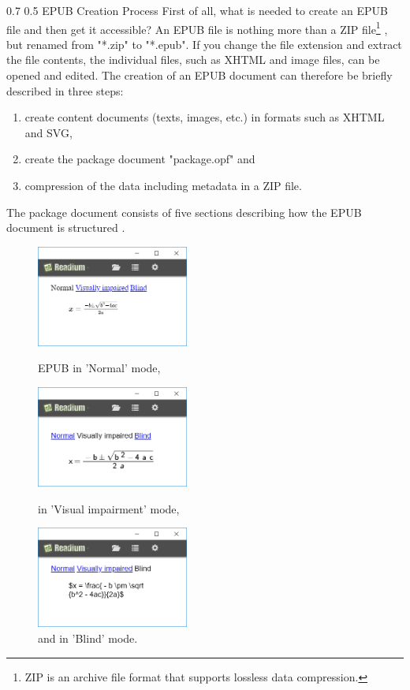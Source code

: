\documentclass{llncs}
\makeatletter
\renewcommand\subsection{\@startsection 
   {subsection}{2}{0mm}%
   {0.7\baselineskip}%
   {0.5\baselineskip}%
   {\bfseries\large}%
   }
\makeatother
\begin{document}
\subsection{EPUB Creation Process}
First of all, what is needed to create an EPUB file and then get it accessible? An EPUB file is nothing more than a ZIP file\footnote{ZIP is an archive file format that supports lossless data compression.} \cite{WhatIsEpub3}, but renamed from "*.zip" to "*.epub". If you change the file extension and extract the file contents, the individual files, such as XHTML and image files, can be opened and edited. The creation of an EPUB document can therefore be briefly described in three steps: 
\begin{enumerate}
\item create content documents (texts, images, etc.) in formats such as XHTML and SVG, 
\item create the package document "package.opf" and 
\item compression of the data including metadata in a ZIP file.
\end{enumerate}
The package document consists of five sections describing how the EPUB document is structured \cite{EPUB3bp}.
\begin{figure}
	\centering
	\begin{minipage}{0.5\textwidth}
		\centering
		\includegraphics[width=50mm]{EquationNo.PNG} 
		\caption{EPUB in 'Normal' mode, }
		\label{fig:epub_normal}
	\end{minipage}\hfill
	\begin{minipage}{0.5\textwidth}
		\centering
		\includegraphics[width=50mm]{EquationVi.PNG} 
		\caption{in 'Visual impairment' mode,}
		\label{fig:epub_viimp}
	\end{minipage}\hfill
	\vspace{0.6cm} 
	\centering
	\includegraphics[width=50mm]{EquationBl.PNG} 
	\caption{and in 'Blind' mode.}
	\label{fig:epub_blind}
\end{figure}
\end{document}
